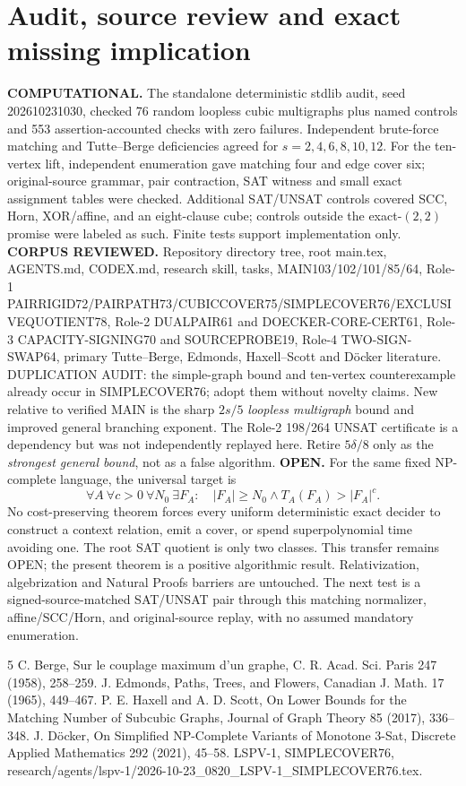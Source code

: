 \documentclass[11pt]{article}
\begin{document}
\section{Audit, source review and exact missing implication}
\textbf{COMPUTATIONAL.} The standalone deterministic stdlib audit, seed 202610231030, checked 76 random loopless cubic multigraphs plus named controls and 553 assertion-accounted checks with zero failures. Independent brute-force matching and Tutte--Berge deficiencies agreed for $s=2,4,6,8,10,12$. For the ten-vertex lift, independent enumeration gave matching four and edge cover six; original-source grammar, pair contraction, SAT witness and small exact assignment tables were checked. Additional SAT/UNSAT controls covered SCC, Horn, XOR/affine, and an eight-clause cube; controls outside the exact-$(2,2)$ promise were labeled as such. Finite tests support implementation only.
\textbf{CORPUS REVIEWED.} Repository directory tree, root main.tex, AGENTS.md, CODEX.md, research skill, tasks, MAIN103/102/101/85/64, Role-1 PAIRRIGID72/PAIRPATH73/CUBICCOVER75/SIMPLECOVER76/EXCLUSIVEQUOTIENT78, Role-2 DUALPAIR61 and DOECKER-CORE-CERT61, Role-3 CAPACITY-SIGNING70 and SOURCEPROBE19, Role-4 TWO-SIGN-SWAP64, primary Tutte--Berge, Edmonds, Haxell--Scott and D\"ocker literature. DUPLICATION AUDIT: the simple-graph bound and ten-vertex counterexample already occur in SIMPLECOVER76; adopt them without novelty claims. New relative to verified MAIN is the sharp $2s/5$ \emph{loopless multigraph} bound and improved general branching exponent. The Role-2 198/264 UNSAT certificate is a dependency but was not independently replayed here. Retire $5\delta/8$ only as the \emph{strongest general bound}, not as a false algorithm.
\textbf{OPEN.} For the same fixed NP-complete language, the universal target is
\[
\forall A\ \forall c>0\ \forall N_0\ \exists F_A:
\quad |F_A|\ge N_0\land T_A(F_A)>|F_A|^c.
\]
No cost-preserving theorem forces every uniform deterministic exact decider to construct a context relation, emit a cover, or spend superpolynomial time avoiding one. The root SAT quotient is only two classes. This transfer remains OPEN; the present theorem is a positive algorithmic result. Relativization, algebrization and Natural Proofs barriers are untouched. The next test is a signed-source-matched SAT/UNSAT pair through this matching normalizer, affine/SCC/Horn, and original-source replay, with no assumed mandatory enumeration.
\begin{thebibliography}{5}
 C. Berge, Sur le couplage maximum d'un graphe, C. R. Acad. Sci. Paris 247 (1958), 258--259.
 J. Edmonds, Paths, Trees, and Flowers, Canadian J. Math. 17 (1965), 449--467.
 P. E. Haxell and A. D. Scott, On Lower Bounds for the Matching Number of Subcubic Graphs, Journal of Graph Theory 85 (2017), 336--348.
 J. D\"ocker, On Simplified NP-Complete Variants of Monotone 3-Sat, Discrete Applied Mathematics 292 (2021), 45--58.
 LSPV-1, SIMPLECOVER76, research/agents/lspv-1/2026-10-23_0820_LSPV-1_SIMPLECOVER76.tex.
\end{thebibliography}
\end{document}
